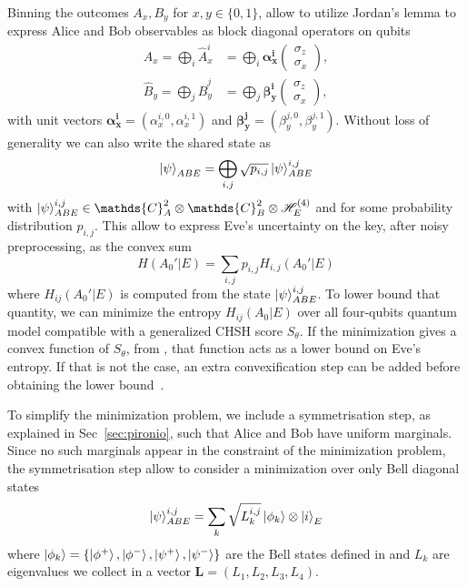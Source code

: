 Binning the outcomes $A_x,B_y$ for $x,y\in\{0,1\}$, allow to utilize Jordan's lemma to express Alice and Bob observables as block diagonal operators on qubits
\begin{equation}
	\begin{split}
		\hat{A}_x = \bigoplus_i \hat{A}_x^i &= \bigoplus_i \mathbf{\alpha_x^i} \begin{pmatrix}\sigma_z \\ \sigma_x\end{pmatrix}, \\
		\hat{B}_y = \bigoplus_j \hat{B}_y^j &= \bigoplus_j \mathbf{\beta_y^i} \begin{pmatrix}\sigma_z \\ \sigma_x\end{pmatrix},
	\end{split}
\end{equation}
with unit vectors $\mathbf{\alpha_x^i} = (\alpha_x^{i,0},\alpha_x^{i,1})$ and $\mathbf{\beta_y^j} = (\beta_y^{j,0},\beta_y^{j,1})$.
Without loss of generality we can also write the shared state as
\begin{equation}
	\ket{\psi}_{ABE} = \bigoplus_{i,j} \sqrt{p_{i,j}} \ket{\psi}_{ABE}^{i,j}	
	\label{eq:}
\end{equation}
with $\ket{\psi}_{ABE}^{i,j} \in \mathds{C}^2_A \otimes \mathds{C}^2_B \otimes \Hil_E^{(4)}$ and for some probability distribution $p_{i,j}$.
This allow to express Eve's uncertainty on the key, after noisy preprocessing, as the convex sum
\begin{equation}
	H(A_0'| E) = \sum_{i,j} p_{i,j} H_{i,j}(A_0' | E)
	\label{eq:H_convex}
\end{equation}
where $H_{ij}(A_0' | E)$ is computed from the state $\ket{\psi}_{ABE}^{i,j}$.
To lower bound that quantity, we can minimize the entropy $H_{ij}(A_0 | E)$ over all four-qubits quantum model compatible with a generalized CHSH score $S_\theta$.
If the minimization gives a convex function of $S_\theta$, from , that function acts as a lower bound on Eve's entropy. 
If that is not the case, an extra convexification step can be added before obtaining the lower bound~\cite{Sekatski2021}.

To simplify the minimization problem, we include a symmetrisation step, as explained in Sec~\ref{sec:pironio}, such that Alice and Bob have uniform marginals.
Since no such marginals appear in the constraint of the minimization problem, the symmetrisation step allow to consider a minimization over only Bell diagonal states~\cite{Pironio2009}
\begin{equation}
	\ket{\psi}_{ABE}^{i,j} = \sum_k \sqrt{L_k^{i,j}} \ket{\phi_k} \otimes \ket{i}_E
	\label{eq:psi_ABE_reduced}
\end{equation}
where $\ket{\phi_k}=\{\ket{\phi^+},\ket{\phi^-},\ket{\psi^+},\ket{\psi^-}\}$ are the Bell states defined in  and $L_k$ are  eigenvalues we collect in a vector $\mathbf{L}=(L_1,L_2,L_3,L_4)$.

